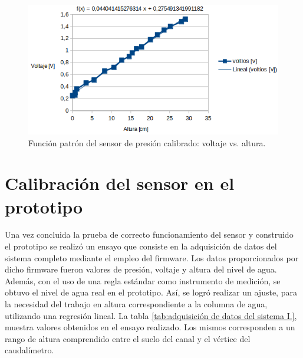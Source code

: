 \begin{figure}[H]
	\centering
	\includegraphics[scale=.75]{./Figures/FuncionPatron-Sensor-VoltajeVsAltura.png}
	\caption{Función patrón del sensor de presión calibrado: voltaje vs. altura.}
	\label{fig:Función patrón del sensor de presión calibrado: voltaje vs. altura}
	\end{figure}
	
\section{Calibración del sensor en el prototipo}
\label{sec:Calibración del sensor en el prototipo}
Una vez concluida la prueba de correcto funcionamiento del sensor y construido el prototipo se realizó un ensayo que consiste en la adquisición de datos del sistema completo mediante el empleo del firmware. Los datos proporcionados por dicho firmware fueron valores de presión, voltaje y altura del nivel de agua. Además, con el uso de una regla estándar como instrumento de medición, se obtuvo el nivel de agua real en el prototipo. Así, se logró realizar un ajuste, para la necesidad del trabajo en altura correspondiente a la columna de agua, utilizando una regresión lineal. La tabla \ref{tab:adquisición de datos del sistema I.}, muestra valores obtenidos en el ensayo realizado. Los mismos corresponden a un rango de altura comprendido entre el suelo del canal y el vértice del caudalímetro.

